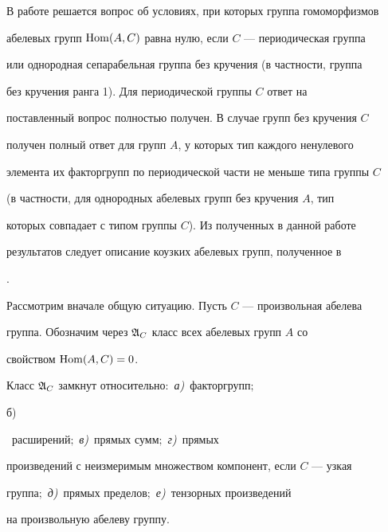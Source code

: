  


 




 


\maketitle 


\label{begin} 


 


В работе решается вопрос об условиях, при которых группа гомоморфизмов 


абелевых групп $\operatorname{Hom}(A,C)$ равна нулю, если $C$ --- периодическая группа 


или однородная сепарабельная группа без кручения (в частности, группа 


без кручения ранга 1). Для периодической группы $C$ ответ на 


поставленный вопрос полностью получен. В случае групп без кручения $C$ 


получен полный ответ для групп $A$, у которых тип каждого ненулевого 


элемента их факторгрупп по периодической части не меньше типа группы $C$ 


(в частности, для однородных абелевых групп без кручения $A$, тип 


которых совпадает с типом группы $C$). Из полученных в данной работе 


результатов следует описание коузких абелевых групп, полученное в 


\cite{1}. 


 


Рассмотрим вначале общую ситуацию. Пусть $C$ --- произвольная абелева 


группа. Обозначим через $\frak A_C$ класс всех абелевых групп $A$ со 


свойством $\operatorname{Hom}(A,C)=0$. 


 


\begin{prop} 


Класс $\frak A_C$ замкнут относительно$:$ {\em а)}~факторгрупп$;$ {\em 


б)}~расширений$;$ {\em в)}~прямых сумм$;$ {\em г)}~прямых 


произведений с неизмеримым множеством компонент, если $C$ --- узкая 


группа$;$ {\em д)}~прямых пределов$;$ {\em е)}~тензорных произведений 


на произвольную абелеву группу. 


\end{prop} 


